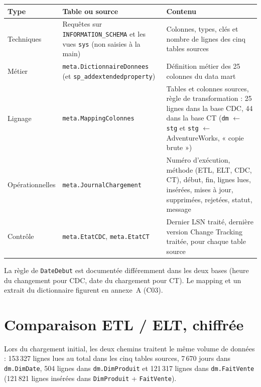 \documentclass[9pt,a4paper]{article}
\begin{document}
\begingroup\small
\begin{tabularx}{\textwidth}{@{}>{\raggedright\arraybackslash}p{2.4cm}>{\raggedright\arraybackslash}p{4.8cm}X@{}}
\toprule
Type & Table ou source & Contenu \\
\midrule
Techniques & Requêtes sur \texttt{INFORMATION\_SCHEMA} et les vues \texttt{sys} (non saisies à la main) & Colonnes, types, clés et nombre de lignes des cinq tables sources \\
Métier & \texttt{meta.DictionnaireDonnees} (et \texttt{sp\_addextendedproperty}) & Définition métier des 25 colonnes du data mart \\
Lignage & \texttt{meta.MappingColonnes} & Tables et colonnes sources, règle de transformation : 25 lignes dans la base CDC, 44 dans la base CT (\texttt{dm} $\leftarrow$ \texttt{stg} et \texttt{stg} $\leftarrow$ AdventureWorks, « copie brute ») \\
Opérationnelles & \texttt{meta.JournalChargement} & Numéro d'exécution, méthode (ETL, ELT, CDC, CT), début, fin, lignes lues, insérées, mises à jour, supprimées, rejetées, statut, message \\
Contrôle & \texttt{meta.EtatCDC}, \texttt{meta.EtatCT} & Dernier LSN traité, dernière version Change Tracking traitée, pour chaque table source \\
\bottomrule
\end{tabularx}
\endgroup

La règle de \texttt{DateDebut} est documentée différemment dans les deux bases (heure du changement pour CDC, date du chargement pour CT). Le mapping et un extrait du dictionnaire figurent en annexe~A (C03).

\section{Comparaison ETL / ELT, chiffrée}

Lors du chargement initial, les deux chemins traitent le même volume de données : 153\,327 lignes lues au total dans les cinq tables sources, 7\,670 jours dans \texttt{dm.DimDate}, 504 lignes dans \texttt{dm.DimProduit} et 121\,317 lignes dans \texttt{dm.FaitVente} (121\,821 lignes insérées dans \texttt{DimProduit} + \texttt{FaitVente}).
\end{document}
